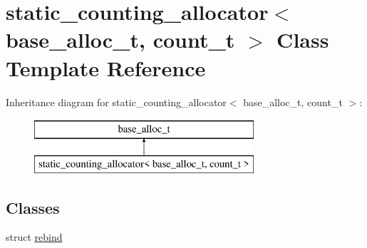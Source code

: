\hypertarget{classstatic__counting__allocator}{}\section{static\+\_\+counting\+\_\+allocator$<$ base\+\_\+alloc\+\_\+t, count\+\_\+t $>$ Class Template Reference}
\label{classstatic__counting__allocator}
Inheritance diagram for static\+\_\+counting\+\_\+allocator$<$ base\+\_\+alloc\+\_\+t, count\+\_\+t $>$\+:\begin{figure}[H]
\begin{center}
\leavevmode
\includegraphics[height=2.000000cm]{classstatic__counting__allocator}
\end{center}
\end{figure}
\subsection*{Classes}
\begin{DoxyCompactItemize}
\item 
struct \hyperlink{structstatic__counting__allocator_1_1rebind}{rebind}
\end{DoxyCompactItemize}
